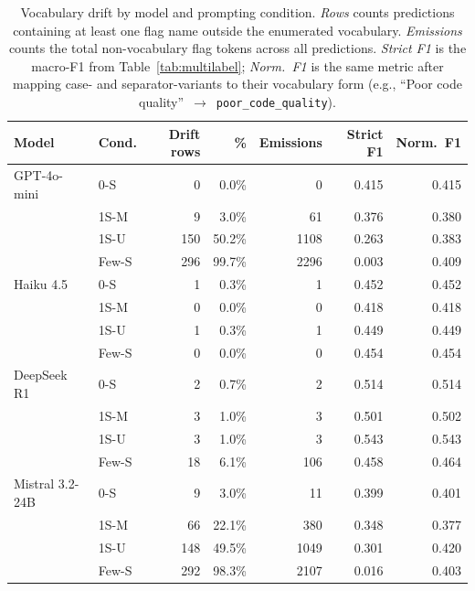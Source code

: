 \begin{table}[t]
\centering
\caption{Vocabulary drift by model and prompting condition. \emph{Rows}
counts predictions containing at least one flag name outside the enumerated
vocabulary. \emph{Emissions} counts the total non-vocabulary flag tokens
across all predictions. \emph{Strict F1} is the macro-F1 from
Table~\ref{tab:multilabel}; \emph{Norm.\ F1} is the same metric after
mapping case- and separator-variants to their vocabulary form
(e.g., ``Poor code quality''~$\rightarrow$~\texttt{poor\_code\_quality}).}
\label{tab:vocab-drift}
\small
\begin{tabular}{llrrrrr}
\toprule
Model & Cond. & Drift rows & \% & Emissions & Strict F1 & Norm.\ F1 \\
\midrule
GPT-4o-mini & 0-S & 0 & 0.0\% & 0 & 0.415 & 0.415 \\
 & 1S-M & 9 & 3.0\% & 61 & 0.376 & 0.380 \\
 & 1S-U & 150 & 50.2\% & 1108 & 0.263 & 0.383 \\
 & Few-S & 296 & 99.7\% & 2296 & 0.003 & 0.409 \\
Haiku 4.5 & 0-S & 1 & 0.3\% & 1 & 0.452 & 0.452 \\
 & 1S-M & 0 & 0.0\% & 0 & 0.418 & 0.418 \\
 & 1S-U & 1 & 0.3\% & 1 & 0.449 & 0.449 \\
 & Few-S & 0 & 0.0\% & 0 & 0.454 & 0.454 \\
DeepSeek R1 & 0-S & 2 & 0.7\% & 2 & 0.514 & 0.514 \\
 & 1S-M & 3 & 1.0\% & 3 & 0.501 & 0.502 \\
 & 1S-U & 3 & 1.0\% & 3 & 0.543 & 0.543 \\
 & Few-S & 18 & 6.1\% & 106 & 0.458 & 0.464 \\
Mistral 3.2-24B & 0-S & 9 & 3.0\% & 11 & 0.399 & 0.401 \\
 & 1S-M & 66 & 22.1\% & 380 & 0.348 & 0.377 \\
 & 1S-U & 148 & 49.5\% & 1049 & 0.301 & 0.420 \\
 & Few-S & 292 & 98.3\% & 2107 & 0.016 & 0.403 \\
\bottomrule
\end{tabular}
\end{table}
